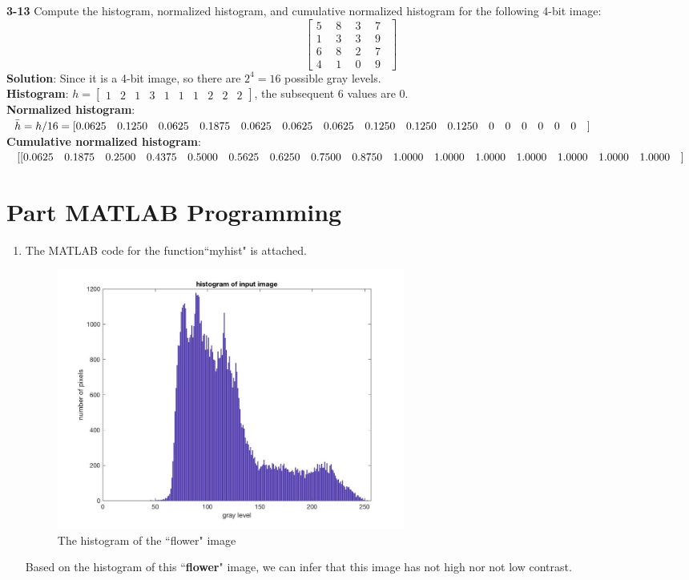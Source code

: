 \documentclass[a4paper]{article}
\begin{document}
\begin{spacing}{2.0}
	\noindent
	\textbf{3-13} Compute the histogram, normalized histogram, and cumulative normalized histogram for the following 4-bit image:	
	$$\begin{bmatrix} 5 \ \ & 8 \ \  & 3 \ \  & 7 \ \  \\ 1 \ \  & 3 \ \  & 3 \ \  & 9 \ \  \\ 6 \ \  & 8 \ \  & 2 \ \  & 7 \ \  \\ 4 \ \  & 1 \ \  & 0  \ \ & 9 \ \  \end{bmatrix}$$
	\textbf{Solution}: Since it is a 4-bit image, so there are $2^4 = 16$ possible gray levels.\\
	\textbf{Histogram}: $h = \begin{bmatrix} 1 & 2 & 1 & 3 & 1 & 1 & 1 & 2 & 2 & 2 \end{bmatrix}$, the subsequent 6 values are 0.\\
	\textbf{Normalized histogram}: $\bar{h} = h/16 = [0.0625 \quad 0.1250 \quad 0.0625 \quad 0.1875 \quad 0.0625 \quad 0.0625 \quad 0.0625 \quad 0.1250 \quad 0.1250 \quad 0.1250 \\ \quad 0 \quad 0 \quad 0 \quad 0 \quad 0 \quad 0 \quad]$\\
	\textbf{Cumulative normalized histogram}: $[[0.0625 \quad 0.1875 \quad 0.2500 \quad 0.4375 \quad 0.5000 \quad 0.5625 \quad 0.6250 \quad 0.7500 \quad 0.8750 \quad 1.0000 \\ \quad 1.0000  \quad 1.0000  \quad 1.0000  \quad 1.0000  \quad 1.0000  \quad 1.0000  \quad]$\\

\newpage	
\section*{\huge\textbf{ Part \uppercase\expandafter{} MATLAB Programming} }
	
	\normalsize
	\begin{enumerate}
	\item The MATLAB code for the function``myhist" is attached. 
		\begin{figure}[H]
		    \centering
	    	    \includegraphics[width=4.5in]{1.jpg}
		    \caption{The histogram of the ``flower" image} 
	    	\end{figure}
	Based on the histogram of this ``\textbf{flower}" image, we can infer that this image has not high nor not low contrast. 
		

\end{enumerate}
\end{spacing}
\end{document}
